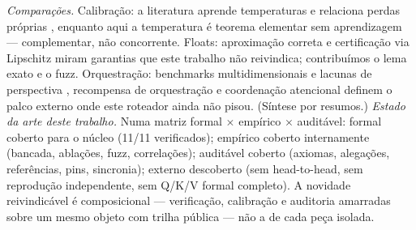 \textit{Comparações.} Calibração: a literatura aprende temperaturas e relaciona perdas próprias \cite{komisarenko2024,xuan2025,xie2024}, enquanto aqui a temperatura é teorema elementar sem aprendizagem --- complementar, não concorrente. Floats: aproximação correta e certificação via Lipschitz \cite{bagnara2019,murray2026} miram garantias que este trabalho não reivindica; contribuímos o lema exato e o fuzz. Orquestração: benchmarks multidimensionais e lacunas de perspectiva \cite{agentbench2023,perspectivegap2026}, recompensa de orquestração \cite{orchrm2026} e coordenação atencional \cite{orchestrator2025} definem o palco externo onde este roteador ainda não pisou. (Síntese por resumos.)
\textit{Estado da arte deste trabalho.} Numa matriz formal $\times$ empírico $\times$ auditável: formal coberto para o núcleo (11/11 verificados); empírico coberto internamente (bancada, ablações, fuzz, correlações); auditável coberto (axiomas, alegações, referências, pins, sincronia); externo descoberto (sem head-to-head, sem reprodução independente, sem Q/K/V formal completo). A novidade reivindicável é composicional --- verificação, calibração e auditoria amarradas sobre um mesmo objeto com trilha pública --- não a de cada peça isolada.
